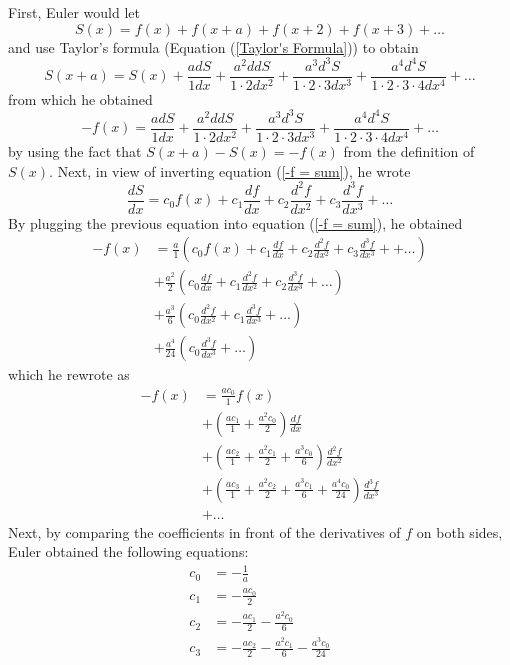 First, Euler would let
$$S(x) = f(x) + f(x + a) + f(x + 2) + f(x + 3) + \dots$$
and use Taylor's formula (Equation (\ref{Taylor's Formula})) to obtain 
$$S(x+a) = S(x) + \frac{adS}{1dx} + \frac{a^2 ddS}{1\cdot 2 dx^2} + \frac{a^3 d^3S}{1\cdot 2\cdot 3 dx^3} + \frac{a^4 d^4S}{1\cdot 2\cdot 3 \cdot 4 dx^4} + \dots$$
from which he obtained 
\begin{equation} \label{-f = sum}
    -f(x) = \frac{adS}{1dx} + \frac{a^2 ddS}{1\cdot 2 dx^2} + \frac{a^3 d^3S}{1\cdot 2\cdot 3 dx^3} + \frac{a^4 d^4S}{1\cdot 2\cdot 3 \cdot 4 dx^4} + \dots
\end{equation}
by using the fact that $S(x+a) - S(x) = -f(x)$ from the  definition of $S(x)$. Next, in view of inverting equation (\ref{-f = sum}), he wrote
\begin{equation}\label{ds/dx in terms of c_ns}
    \frac{dS}{dx} = c_0 f(x) + c_1 \frac{df}{dx} + c_2 \frac{d^2 f}{dx^2} + c_3 \frac{d^3 f}{dx^3} +\dots
\end{equation}
By plugging the previous equation into equation (\ref{-f = sum}), he obtained
\begin{align*}
    -f(x) &= \frac{a}{1}\left(c_0 f(x) + c_1 \frac{df}{dx} + c_2 \frac{d^2f}{dx^2} + c_3 \frac{d^3f}{dx^3} +  + \dots\right) \\
    &+\frac{a^2}{2}\left(c_0 \frac{df}{dx} + c_1 \frac{d^2f}{dx^2} + c_2 \frac{d^3f}{dx^3} + \dots\right) \\
    &+ \frac{a^3}{6}\left(c_0 \frac{d^2f}{dx^2} + c_1 \frac{d^3f}{dx^3} + \dots\right) \\
    &+ \frac{a^4}{24}\left(c_0 \frac{d^3f}{dx^3} + \dots\right)
\end{align*}
which he rewrote as 
\begin{align*}
    -f(x) &= \frac{ac_0}{1} f(x) \\
    &+ \left(\frac{ac_1}{1} + \frac{a^2c_0}{2}\right)\frac{df}{dx} \\
    &+ \left(\frac{ac_2}{1} + \frac{a^2c_1}{2} + \frac{a^3 c_0}{6} \right)\frac{d^2f}{dx^2}  \\
    &+ \left(\frac{ac_3}{1} + \frac{a^2c_2}{2} + \frac{a^3 c_1}{6} + \frac{a^4 c_0}{24}\right)\frac{d^3f}{dx^3} \\
    &+ \dots 
\end{align*}
Next, by comparing the coefficients in front of the derivatives of $f$ on both sides, Euler obtained the following equations:
\begin{align*}
    c_0 &= -\frac{1}{a} \\
    c_1 &= -\frac{ac_0}{2} \\
    c_2 &= -\frac{ac_1}{2} - \frac{a^2c_0}{6} \\
    c_3 &= -\frac{ac_2}{2} - \frac{a^2c_1}{6} - \frac{a^3c_0}{24}
\end{align*}
